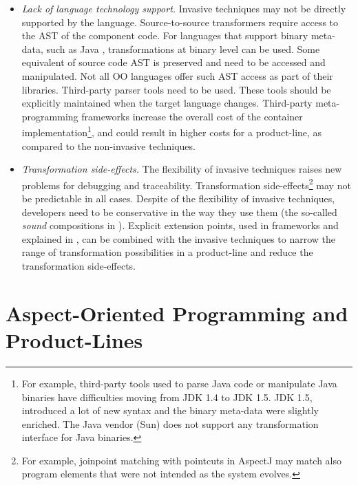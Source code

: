 \begin{itemize}
\item \textit{Lack of language technology support.} Invasive techniques may not be directly supported by the language. Source-to-source transformers require access to the AST of the component code. For languages that support binary meta-data, such as Java \cite{www.java}, transformations at binary level can be used. Some equivalent of source code AST is preserved and need to be accessed and manipulated.  Not all OO languages offer such AST access as part of their libraries. Third-party parser tools need to be used. These tools should be explicitly maintained when the target language changes. Third-party meta-programming frameworks increase the overall cost of the container implementation\footnote{For example, third-party tools used to parse Java code or manipulate Java binaries have difficulties moving from JDK 1.4 to JDK 1.5. JDK 1.5, introduced a lot of new syntax and the binary meta-data were slightly enriched. The Java vendor (Sun) does not support any transformation interface for Java binaries.}, and could result in higher costs for a product-line, as compared to the non-invasive techniques. 

\item \textit{Transformation side-effects.} The flexibility of invasive techniques raises new problems for debugging and traceability. Transformation side-effects\footnote{For example, joinpoint matching with pointcuts in AspectJ \cite{www.aspectjt} may match also program elements that were not intended as the system evolves.} may not be predictable in all cases. Despite of the flexibility of invasive techniques, developers need to be conservative in the way they use them (the so-called \textit{sound} compositions in \cite{java.compost}). Explicit extension points, used in frameworks and explained in , can be combined with the invasive techniques to narrow the range of transformation possibilities in a product-line and reduce the transformation side-effects.
\end{itemize}

\section{Aspect-Oriented Programming and Product-Lines}
\label{ch2:aop}

